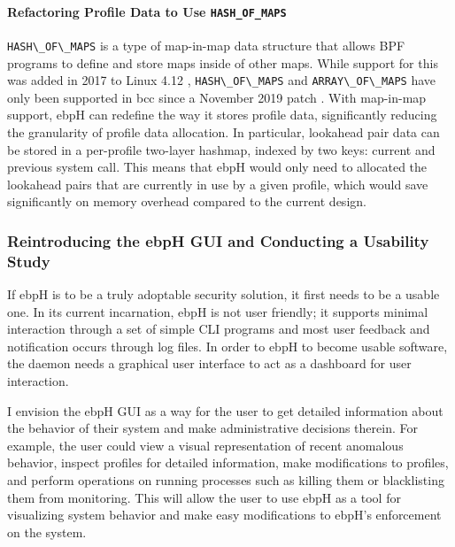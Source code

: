 \documentclass[
  12pt]{findlay}
\newcommand{\passthrough}[1]{#1}
\begin{document}
\hypertarget{refactoring-profile-data-to-use-hash_of_maps}{%
\paragraph{\texorpdfstring{Refactoring Profile Data to Use
\texttt{HASH\_OF\_MAPS}}{Refactoring Profile Data to Use HASH\_OF\_MAPS}}\label{refactoring-profile-data-to-use-hash_of_maps}}

\passthrough{\lstinline!HASH\_OF\_MAPS!} \autocite{bcc,gregg19bpf} is a
type of map-in-map data structure that allows BPF programs to define and
store maps inside of other maps. While support for this was added in
2017 to Linux 4.12 \autocite{lau17},
\passthrough{\lstinline!HASH\_OF\_MAPS!} and
\passthrough{\lstinline!ARRAY\_OF\_MAPS!} have only been supported in
bcc \autocite{bcc} since a November 2019 patch \autocite{song19}. With
map-in-map support, ebpH can redefine the way it stores profile data,
significantly reducing the granularity of profile data allocation. In
particular, lookahead pair data can be stored in a per-profile two-layer
hashmap, indexed by two keys: current and previous system call. This
means that ebpH would only need to allocated the lookahead pairs that
are currently in use by a given profile, which would save significantly
on memory overhead compared to the current design.

\hypertarget{reintroducing-the-ebph-gui-and-conducting-a-usability-study}{%
\subsubsection{Reintroducing the ebpH GUI and Conducting a Usability
Study}\label{reintroducing-the-ebph-gui-and-conducting-a-usability-study}}

\label{gui_section}

If ebpH is to be a truly adoptable security solution, it first needs to
be a usable one. In its current incarnation, ebpH is not user friendly;
it supports minimal interaction through a set of simple CLI programs and
most user feedback and notification occurs through log files. In order
to ebpH to become usable software, the daemon needs a graphical user
interface to act as a dashboard for user interaction.

I envision the ebpH GUI as a way for the user to get detailed
information about the behavior of their system and make administrative
decisions therein. For example, the user could view a visual
representation of recent anomalous behavior, inspect profiles for
detailed information, make modifications to profiles, and perform
operations on running processes such as killing them or blacklisting
them from monitoring. This will allow the user to use ebpH as a tool for
visualizing system behavior and make easy modifications to ebpH's
enforcement on the system.
\end{document}
